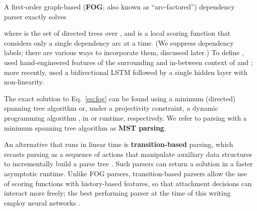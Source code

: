 \documentclass[11pt,letterpaper]{article}
\newcommand{\ignore}[1]{}
\newcommand{\lingpengcomment}[1]{\ignore{\textcolor{green}{{\textbf{[#1 --\textsc{lpk}]}}}}}
\newcommand{\cjd}[1]{\textcolor{cyan}{\ignore{{\textbf{[#1 --\textsc{cjd}]}}}}}
\newcommand{\nascomment}[1]{\ignore{\textcolor{blue}{{\textbf{[#1 --\textsc{nas}]}}}}}
\newcommand{\miguelcomment}[1]{\ignore{\textcolor{red}{{\textbf{[#1 --\textsc{miguel}]}}}}}
\begin{document}
A first-order graph-based (\textbf{FOG}; also known as ``arc-factored'') dependency parser exactly solves

where  is the set of directed trees over , and
 is a local scoring function that considers only a single dependency arc at a time.  (We 
suppress dependency labels; there are various ways to incorporate them, discussed later.)
To define ,  used hand-engineered features of the surrounding and in-between context of  and ; more recently,  used a bidirectional LSTM followed by a single hidden layer with non-linearity.

The exact solution to Eq.~\ref{eq:fog} can be found using a minimum (directed) spanning tree algorithm \cite{nonprojective_mcdonald} or, under a projectivity constraint, a dynamic programming algorithm \cite{eisner}, in  or  runtime, respectively. We refer to parsing with a minimum spanning tree algorithm as \textbf{MST parsing}.

An alternative that runs in linear time is \textbf{transition-based} parsing, which recasts parsing as a sequence of actions that manipulate auxiliary data structures to incrementally build a parse tree \cite{Nivre2003}. Such parsers can return a solution in a faster  asymptotic runtime. Unlike FOG parsers, transition-based parsers allow the use of scoring functions with history-based features, so that attachment decisions can interact more freely; the best performing parser at the time of this writing employ neural networks \cite{globally_normalized}.
\ignore{\miguelcomment{The idea of adding the paragraph above as a footnote was if the below paragraph was included... not sure like this (the paragraph with the cheap alternative is ignored), but probably as it is now. Be careful with the claim about richer than FOG parsers... this might "offend" people and we do not want that.}}

\ignore{Another cheap alternative, which might result in a parse that is not a well-formed tree, is to construct  as
, i.e., greedily assign each word its highest-scoring head.  This is a relaxation of Eq.~\ref{eq:fog}, hence we call it \textbf{relaxed}  parsing.  A na{\"i}ve implementation runs in  time\footnote{The quadratic complexity arises from looping over all head-modifier attachment pairs}, although without the guarantee of finding a well-formed tree. \ignore{\nascomment{Actually, I'm not sure it does.  There are  words, and we need to find the max for each one.  So this might be better than quadratic if you're clever, but naively it's quadratic.  so maybe drop that last sentence.}\cjd{I think this is wrong. The obvious algorithm is to max over each word at each position, so . When counting votes, you might be able to use a heap or something and get something like  where  is the number of things in the ensemble, but that's a bit too fussy. I'd just say this is quadratic.} \lingpengcomment{I think it's quadratic} \miguelcomment{I agree.}}}
\end{document}
